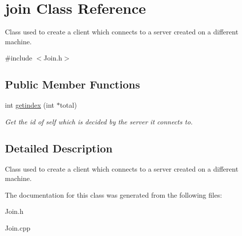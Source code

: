 \hypertarget{classjoin}{\section{join Class Reference}
\label{classjoin}
}


Class used to create a client which connects to a server created on a different machine.  




{\ttfamily \#include $<$Join.\-h$>$}

\subsection*{Public Member Functions}
\begin{DoxyCompactItemize}
\item 
\hypertarget{classjoin_a68e2de8b350a17580bdd54932f3458e8}{int \hyperlink{classjoin_a68e2de8b350a17580bdd54932f3458e8}{getindex} (int $\ast$total)}\label{classjoin_a68e2de8b350a17580bdd54932f3458e8}

\begin{DoxyCompactList}\small\item\em Get the id of self which is decided by the server it connects to. \end{DoxyCompactList}\end{DoxyCompactItemize}


\subsection{Detailed Description}
Class used to create a client which connects to a server created on a different machine. 

The documentation for this class was generated from the following files\-:\begin{DoxyCompactItemize}
\item 
Join.\-h\item 
Join.\-cpp\end{DoxyCompactItemize}
